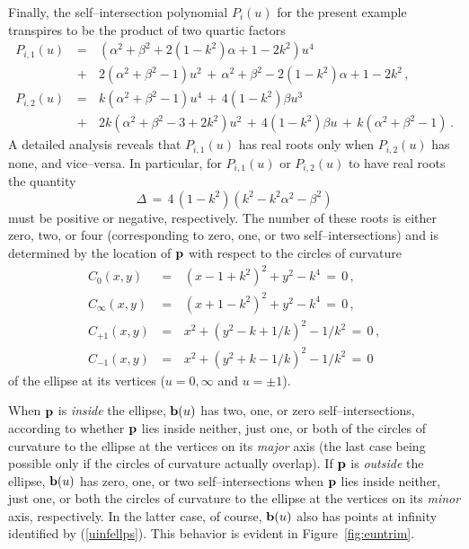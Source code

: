 Finally, the self--intersection polynomial $P_i(u)$ for the present
example transpires to be the product of two quartic factors
\begin{eqnarray} \label{Iellps}
P_{i,1}(u) &\,=\,&
(\alpha^2+\beta^2+2(1-k^2)\alpha+1-2k^2)u^4 \nonumber \\
&\,+\,& 2(\alpha^2+\beta^2-1)u^2 \,+\, \alpha^2+\beta^2
-2(1-k^2)\alpha+1-2k^2 \,, \\
P_{i,2}(u) &\,=\,&
k(\alpha^2+\beta^2-1)u^4 \,+\, 4(1-k^2)\beta u^3 \nonumber \\
&\,+\,& 2k(\alpha^2+\beta^2-3+2k^2)u^2
\,+\, 4(1-k^2)\beta u \,+\, k(\alpha^2+\beta^2-1) \,. \nonumber
\end{eqnarray}
A detailed analysis \cite{farouki91} reveals that $P_{i,1}(u)$
has real roots only when $P_{i,2}(u)$ has none, and vice--versa.
In particular, for $P_{i,1}(u)$ or $P_{i,2}(u)$ to have real roots
the quantity
\begin{equation} \label{discrim1}
\Delta \,=\, 4\,(1-k^2)(k^2-k^2\alpha^2-\beta^2)
\end{equation}
must be positive or negative, respectively. The number of these
roots is either zero, two, or four (corresponding to zero, one,
or two self--intersections) and is determined by the location of
${\bf p}$ with respect to the circles of curvature
\begin{eqnarray} \label{ecircles}
C_0(x,y) &\,=\,& (x-1+k^2)^2 + y^2 - k^4 \,=\, 0 \,, \nonumber \\
C_\infty(x,y) &\,=\,& (x+1-k^2)^2 + y^2 - k^4 \,=\, 0 \,, \nonumber \\
C_{+1}(x,y) &\,=\,& x^2 + (y^2-k+1/k)^2 - 1/k^2 \,=\, 0 \,, \nonumber \\
C_{-1}(x,y) &\,=\,& x^2 + (y^2+k-1/k)^2 - 1/k^2 \,=\, 0
\end{eqnarray}
of the ellipse at its vertices ($u=0,\infty$ and $u=\pm 1$).

When ${\bf p}$ is {\it inside\/} the ellipse, ${\bf b}(u)$
has two, one, or zero self--intersections, according to whether
${\bf p}$ lies inside neither, just one, or both of the circles
of curvature to the ellipse at the vertices on its {\it major\/}
axis (the last case being possible only if the circles of
curvature actually overlap). If ${\bf p}$ is {\it outside\/}
the ellipse, ${\bf b}(u)$ has zero, one, or two self--intersections
when ${\bf p}$ lies inside neither, just one, or both the circles
of curvature to the ellipse at the vertices on its {\it minor\/}
axis, respectively. In the latter case, of course, ${\bf b}(u)$
also has points at infinity identified by (\ref{uinfellps}).
This behavior is evident in Figure~\ref{fig:euntrim}.

